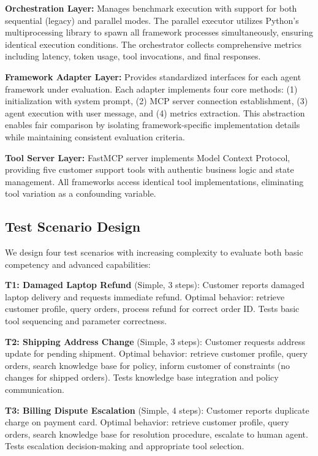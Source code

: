 \documentclass[sigconf,nonacm]{acmart}
\begin{document}
\textbf{Orchestration Layer:} Manages benchmark execution with support for both sequential (legacy) and parallel modes. The parallel executor utilizes Python's multiprocessing library to spawn all framework processes simultaneously, ensuring identical execution conditions. The orchestrator collects comprehensive metrics including latency, token usage, tool invocations, and final responses.

\textbf{Framework Adapter Layer:} Provides standardized interfaces for each agent framework under evaluation. Each adapter implements four core methods: (1) initialization with system prompt, (2) MCP server connection establishment, (3) agent execution with user message, and (4) metrics extraction. This abstraction enables fair comparison by isolating framework-specific implementation details while maintaining consistent evaluation criteria.

\textbf{Tool Server Layer:} FastMCP server implements Model Context Protocol, providing five customer support tools with authentic business logic and state management. All frameworks access identical tool implementations, eliminating tool variation as a confounding variable.

\subsection{Test Scenario Design}

We design four test scenarios with increasing complexity to evaluate both basic competency and advanced capabilities:

\textbf{T1: Damaged Laptop Refund} (Simple, 3 steps): Customer reports damaged laptop delivery and requests immediate refund. Optimal behavior: retrieve customer profile, query orders, process refund for correct order ID. Tests basic tool sequencing and parameter correctness.

\textbf{T2: Shipping Address Change} (Simple, 3 steps): Customer requests address update for pending shipment. Optimal behavior: retrieve customer profile, query orders, search knowledge base for policy, inform customer of constraints (no changes for shipped orders). Tests knowledge base integration and policy communication.

\textbf{T3: Billing Dispute Escalation} (Simple, 4 steps): Customer reports duplicate charge on payment card. Optimal behavior: retrieve customer profile, query orders, search knowledge base for resolution procedure, escalate to human agent. Tests escalation decision-making and appropriate tool selection.
\end{document}
